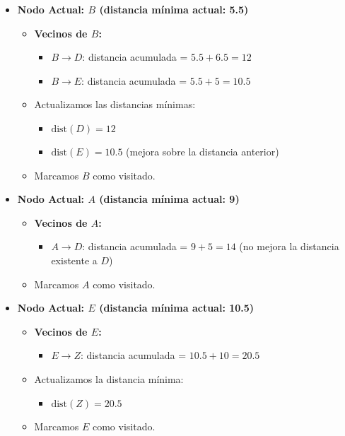 \documentclass{article}
\begin{document}
\begin{itemize}
    \item \textbf{Nodo Actual: \( B \) (distancia mínima actual: 5.5)}
    \begin{itemize}
        \item \textbf{Vecinos de \( B \):}
        \begin{itemize}
            \item \( B \rightarrow D \): distancia acumulada = \( 5.5 + 6.5 = 12 \)
            \item \( B \rightarrow E \): distancia acumulada = \( 5.5 + 5 = 10.5 \)
        \end{itemize}
        \item Actualizamos las distancias mínimas:
        \begin{itemize}
            \item \( \text{dist}(D) = 12 \)
            \item \( \text{dist}(E) = 10.5 \) (mejora sobre la distancia anterior)
        \end{itemize}
        \item Marcamos \( B \) como visitado.
    \end{itemize}

    \item \textbf{Nodo Actual: \( A \) (distancia mínima actual: 9)}
    \begin{itemize}
        \item \textbf{Vecinos de \( A \):}
        \begin{itemize}
            \item \( A \rightarrow D \): distancia acumulada = \( 9 + 5 = 14 \) (no mejora la distancia existente a \( D \))
        \end{itemize}
        \item Marcamos \( A \) como visitado.
    \end{itemize}

    \item \textbf{Nodo Actual: \( E \) (distancia mínima actual: 10.5)}
    \begin{itemize}
        \item \textbf{Vecinos de \( E \):}
        \begin{itemize}
            \item \( E \rightarrow Z \): distancia acumulada = \( 10.5 + 10 = 20.5 \)
        \end{itemize}
        \item Actualizamos la distancia mínima:
        \begin{itemize}
            \item \( \text{dist}(Z) = 20.5 \)
        \end{itemize}
        \item Marcamos \( E \) como visitado.
    \end{itemize}


\end{itemize}
\end{document}
